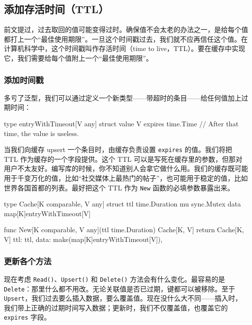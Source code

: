 \subsection{添加存活时间（TTL）}

前文提过，过去取回的值可能变得过时。确保值不会太老的办法之一，是给每个值都打上一个``最佳使用期限''。一旦这个时间戳过去，我们就不应再信任这个值。在计算机科学中，这个时间戳叫作存活时间（time to live，TTL）。要在缓存中实现它，我们需要给每个值附上一个``最佳使用期限''。

\subsubsection*{添加时间戳}

多亏了泛型，我们可以通过定义一个新类型——带超时的条目——给任何值加上过期时间：

\begin{gocode}[]
type entryWithTimeout[V any] struct {
    value   V
    expires time.Time // After that time, the value is useless.
}
\end{gocode}

当我们向缓存 upsert 一个条目时，由缓存负责设置 \texttt{expires} 的值。我们将把 TTL 作为缓存的一个字段提供。这个 TTL 可以是写死在缓存里的参数，但那对用户不太友好。编写库的时候，你不知道别人会拿它做什么用。我们的缓存既可能用于千变万化的值，比如``社交媒体上最热门的帖子''，也可能用于稳定的值，比如世界各国首都的列表。最好把这个 TTL 作为 \texttt{New} 函数的必填参数暴露出来。

\begin{gocode}[title={代码清单 7.12 \texttt{cache.go}：创建带 TTL 的缓存}]
type Cache[K comparable, V any] struct {
    ttl  time.Duration
    mu   sync.Mutex
    data map[K]entryWithTimeout[V]
}

func New[K comparable, V any](ttl time.Duration) Cache[K, V] {
    return Cache[K, V]{
        ttl:        ttl,
        data:       make(map[K]entryWithTimeout[V]),
    }
}
\end{gocode}

\subsubsection*{更新各个方法}

现在考虑 \texttt{Read()}、\texttt{Upsert()} 和 \texttt{Delete()} 方法会有什么变化。最容易的是 \texttt{Delete}：那里什么都不用改。无论关联值是否已过期，键都可以被移除。至于 \texttt{Upsert}，我们过去要么插入数据，要么覆盖值。现在没什么大不同——插入时，我们带上正确的过期时间写入数据；更新时，我们不仅覆盖值，也覆盖它的 \texttt{expires} 字段。

